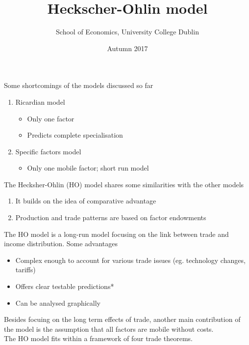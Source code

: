 \documentclass{beamer}
\title{Heckscher-Ohlin model}
\author{School of Economics, University College Dublin}
\date{Autumn 2017}
\begin{document}
\begin{frame}
\titlepage  
\end{frame}

\begin{frame}
  Some shortcomings of the models discussed so far
  \medskip
  \begin{enumerate}
    \item Ricardian model
    \begin{itemize}
      \item Only one factor
      \item Predicts complete specialisation
    \end{itemize}
    \medskip
    \item Specific factors model
    \begin{itemize}
      \item Only one mobile factor; short run model
    \end{itemize}
  \end{enumerate}
\end{frame}

\begin{frame}
  The Hecksher-Ohlin (HO) model shares some similarities with the other models 
  \medskip
  \begin{enumerate}
    \item It builds on the idea of comparative advantage
    \item Production and trade patterns are based on factor endowments
  \end{enumerate}  
\end{frame}

\begin{frame}
  The HO model is a long-run model focusing on the link between trade and income distribution. 
  Some advantages
  \begin{itemize}
    \item Complex enough to account for various trade issues (eg. technology changes, tariffs)
    \item Offers clear testable predictions*
    \item Can be analysed graphically
  \end{itemize}
\medskip
Besides focuing on the long term effects of trade, another main contribution of the model is the assumption that all factors are mobile without costs.\\
\medskip
The HO model fits within a framework of four trade theorems. 
\end{frame}
\end{document}

